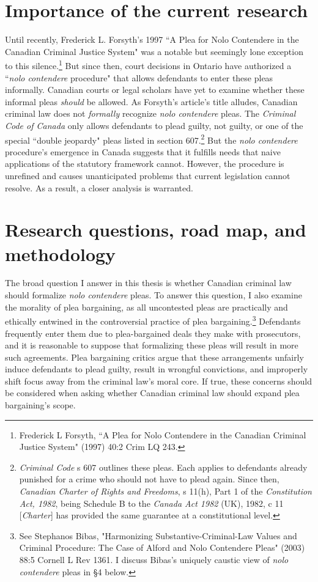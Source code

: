 \section{Importance of the current research}

Until recently, Frederick L. Forsyth's 1997 ``A Plea for Nolo Contendere in the Canadian Criminal Justice System" was a notable but seemingly lone exception to this silence.\footnote{Frederick L Forsyth, ``A Plea for Nolo Contendere in the Canadian Criminal Justice System" (1997) 40:2 Crim LQ 243.} But since then, court decisions in Ontario have authorized a ``\textit{nolo contendere} procedure" that allows defendants to enter these pleas informally. Canadian courts or legal scholars have yet to examine whether these informal pleas \textit{should} be allowed. As Forsyth's article's title alludes, Canadian criminal law does not \textit{formally} recognize \textit{nolo contendere} pleas. The \textit{Criminal Code of Canada} only allows defendants to plead guilty, not guilty, or one of the special ``double jeopardy" pleas listed in section 607.\footnote{\textit{Criminal Code} s 607 outlines these pleas. Each applies to defendants already punished for a crime who should not have to plead again. Since then, \textit{Canadian Charter of Rights and Freedoms}, s 11(h), Part 1 of the \textit{Constitution Act, 1982}, being Schedule B to the \textit{Canada Act 1982} (UK), 1982, c 11 [\textit{Charter}] has provided the same guarantee at a constitutional level.} But the \textit{nolo contendere} procedure's emergence in Canada suggests that it fulfills needs that naive applications of the statutory framework cannot. However, the procedure is unrefined and causes unanticipated problems that current legislation cannot resolve. As a result, a closer analysis is warranted.

\section{Research questions, road map, and methodology}

The broad question I answer in this thesis is whether Canadian criminal law should formalize \textit{nolo contendere} pleas. To answer this question, I also examine the morality of plea bargaining, as all uncontested pleas are practically and ethically entwined in the controversial practice of plea bargaining.\footnote{See Stephanos Bibas, "Harmonizing Substantive-Criminal-Law Values and Criminal Procedure:
The Case of Alford and Nolo Contendere Pleas" (2003) 88:5 Cornell L Rev 1361. I discuss Bibas's uniquely caustic view of \textit{nolo contendere} pleas in \S4 below.} Defendants frequently enter them due to plea-bargained deals they make with prosecutors, and it is reasonable to suppose that formalizing these pleas will result in more such agreements. Plea bargaining critics argue that these arrangements unfairly induce defendants to plead guilty, result in wrongful convictions, and improperly shift focus away from the criminal law's moral core. If true, these concerns should be considered when asking whether Canadian criminal law should expand plea bargaining's scope.

